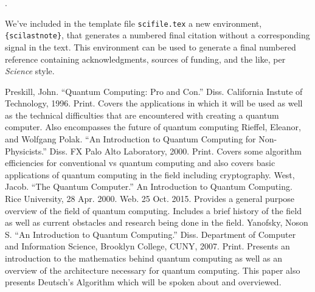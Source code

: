 \documentclass[12pt]{article}
\newcounter{lastnote}
\newenvironment{scilastnote}{%
\setcounter{lastnote}{\value{enumiv}}%
\addtocounter{lastnote}{+1}%
\begin{list}%
{\arabic{lastnote}.}
{\setlength{\leftmargin}{.22in}}
{\setlength{\labelsep}{.5em}}}
{\end{list}}
\begin{document}









\begin{scilastnote}
\item We've included in the template file \texttt{scifile.tex} a new
environment, \texttt{\{scilastnote\}}, that generates a numbered final
citation without a corresponding signal in the text.  This environment
can be used to generate a final numbered reference containing
acknowledgments, sources of funding, and the like, per {\it Science\/}
style.
\end{scilastnote}

\newpage

\begin{thebibliography}{1}
Preskill, John. ``Quantum Computing: Pro and Con.'' Diss. California Instute of Technology, 1996. Print. Covers the applications in which it will be used as well as the technical difficulties that are encountered with creating a quantum computer. Also encompasses the future of quantum computing
Rieffel, Eleanor, and Wolfgang Polak. ``An Introduction to Quantum Computing for Non-Physicists.'' Diss. FX Palo Alto Laboratory, 2000. Print. Covers some algorithm efficiencies for conventional vs quantum computing and also covers basic applications of quantum computing in the field including cryptography.
West, Jacob. ``The Quantum Computer.'' An Introduction to Quantum Computing. Rice University, 28 Apr. 2000. Web. 25 Oct. 2015. Provides a general purpose overview of the field of quantum computing. Includes a brief history of the field as well as current obstacles and research being done in the field.
Yanofsky, Noson S. ``An Introduction to Quantum Computing.'' Diss. Department of Computer and Information Science, Brooklyn College, CUNY, 2007. Print. Presents an introduction to the mathematics behind quantum computing as well as an overview of the architecture necessary for quantum computing. This paper also presents Deutsch's Algorithm which will be spoken about and overviewed.
\end{thebibliography}
\end{document}
